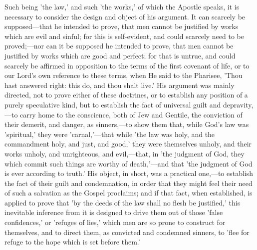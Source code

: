 \documentclass[
]{book}
\begin{document}
Such being 'the law,' and such 'the works,' of which the Apostle speaks, it is necessary to consider the design and object of his argument. It can scarcely be supposed---that he intended to prove, that men cannot be justified by works which are evil and sinful; for this is self-evident, and could scarcely need to be proved;---nor can it be supposed he intended to prove, that men cannot be justified by works which are good and perfect; for that is untrue, and could scarcely be affirmed in opposition to the terms of the first covenant of life, or to our Lord's own reference to these terms, when He said to the Pharisee, 'Thou hast answered right: this do, and thou shalt live.' His argument was mainly directed, not to prove either of these doctrines, or to establish any position of a purely speculative kind, but to establish the fact of universal guilt and depravity,---to carry home to the conscience, both of Jew and Gentile, the conviction of their demerit, and danger, as sinners,---to show them that, while God's law was 'spiritual,' they were 'carnal,'---that while 'the law was holy, and the commandment holy, and just, and good,' they were themselves unholy, and their works unholy, and unrighteous, and evil,---that, in 'the judgment of God, they which commit such things are worthy of death,'---and that 'the judgment of God is ever according to truth.' His object, in short, was a practical one,---to establish the fact of their guilt and condemnation, in order that they might feel their need of such a salvation as the Gospel proclaims; and if that fact, when established, is applied to prove that 'by the deeds of the law shall no flesh be justified,' this inevitable inference from it is designed to drive them out of those 'false confidences,' or 'refuges of lies,' which men are so prone to construct for themselves, and to direct them, as convicted and condemned sinners, to 'flee for refuge to the hope which is set before them.'
\end{document}
